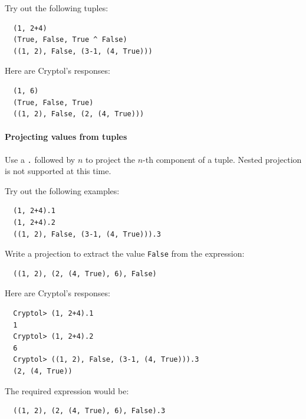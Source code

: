 
\begin{Exercise}\label{ex:tup:1}
Try out the following tuples:
\begin{Verbatim}
  (1, 2+4)
  (True, False, True ^ False)
  ((1, 2), False, (3-1, (4, True)))
\end{Verbatim}
\end{Exercise}
\begin{Answer}
Here are Cryptol's responses:
\begin{Verbatim}
  (1, 6)
  (True, False, True)
  ((1, 2), False, (2, (4, True)))
\end{Verbatim}
\end{Answer}


\paragraph*{Projecting values from tuples} Use a {\tt .} followed by
$n$ to project the $n$-th component of a tuple.  Nested projection is
not supported at this time.

\begin{Exercise}\label{ex:tup:2}
Try out the following examples:
\begin{Verbatim}
  (1, 2+4).1
  (1, 2+4).2
  ((1, 2), False, (3-1, (4, True))).3
\end{Verbatim}
  Write a
projection to extract the value {\tt False} from the expression:
\begin{Verbatim}
  ((1, 2), (2, (4, True), 6), False)
\end{Verbatim}
\end{Exercise}
\begin{Answer}
Here are Cryptol's responses:
\begin{Verbatim}
  Cryptol> (1, 2+4).1
  1
  Cryptol> (1, 2+4).2
  6
  Cryptol> ((1, 2), False, (3-1, (4, True))).3
  (2, (4, True))
\end{Verbatim}
The required expression would be:
\begin{Verbatim}
  ((1, 2), (2, (4, True), 6), False).3
\end{Verbatim}
\end{Answer}


